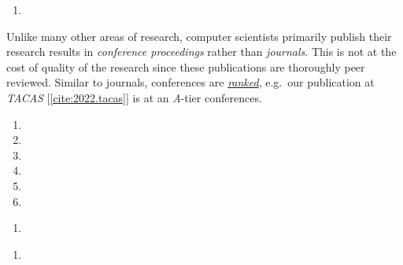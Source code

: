 

\divider



\divider



\newpage
\begin{fullwidth}


  \begin{enumerate} \normalsize
  \item 
  \end{enumerate}


  Unlike many other areas of research, computer scientists primarily publish their research results
  in \emph{conference proceedings} rather than \emph{journals}. This is not at the cost of quality
  of the research since these publications are thoroughly peer reviewed. Similar to journals,
  conferences are \href{https://portal.core.edu.au/conf-ranks/}{\emph{ranked}}, e.g.\ our
  publication at \emph{TACAS} [\ref{cite:2022.tacas}] is at an \emph{A}-tier conferences.

  \medskip

  \begin{enumerate} \normalsize \setcounter{enumi}{1}
  \item  \divider
  \item  \divider
  \item  \divider
  \item  \divider
  \item  \divider
  \item 
  \end{enumerate}

  \begin{enumerate} \normalsize \setcounter{enumi}{7}
  \item 
  \end{enumerate}

  \begin{enumerate} \normalsize \setcounter{enumi}{8 }
  \item 
  \end{enumerate}
\end{fullwidth}


